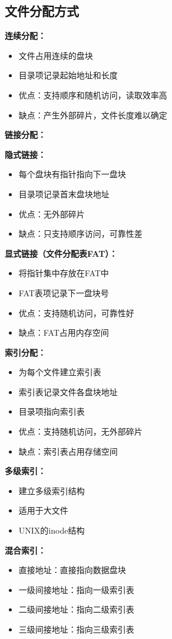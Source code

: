 \documentclass[lang=cn,newtx,10pt,scheme=chinese]{../../elegantbook}
\begin{document}
\subsection{文件分配方式}

\textbf{连续分配：}
\begin{itemize}
  \item 文件占用连续的盘块
  \item 目录项记录起始地址和长度
  \item 优点：支持顺序和随机访问，读取效率高
  \item 缺点：产生外部碎片，文件长度难以确定
\end{itemize}

\textbf{链接分配：}

\textbf{隐式链接：}
\begin{itemize}
  \item 每个盘块有指针指向下一盘块
  \item 目录项记录首末盘块地址
  \item 优点：无外部碎片
  \item 缺点：只支持顺序访问，可靠性差
\end{itemize}

\textbf{显式链接（文件分配表FAT）：}
\begin{itemize}
  \item 将指针集中存放在FAT中
  \item FAT表项记录下一盘块号
  \item 优点：支持随机访问，可靠性好
  \item 缺点：FAT占用内存空间
\end{itemize}

\textbf{索引分配：}
\begin{itemize}
  \item 为每个文件建立索引表
  \item 索引表记录文件各盘块地址
  \item 目录项指向索引表
  \item 优点：支持随机访问，无外部碎片
  \item 缺点：索引表占用存储空间
\end{itemize}

\textbf{多级索引：}
\begin{itemize}
  \item 建立多级索引结构
  \item 适用于大文件
  \item UNIX的inode结构
\end{itemize}

\textbf{混合索引：}
\begin{itemize}
  \item 直接地址：直接指向数据盘块
  \item 一级间接地址：指向一级索引表
  \item 二级间接地址：指向二级索引表
  \item 三级间接地址：指向三级索引表
\end{itemize}
\end{document}
